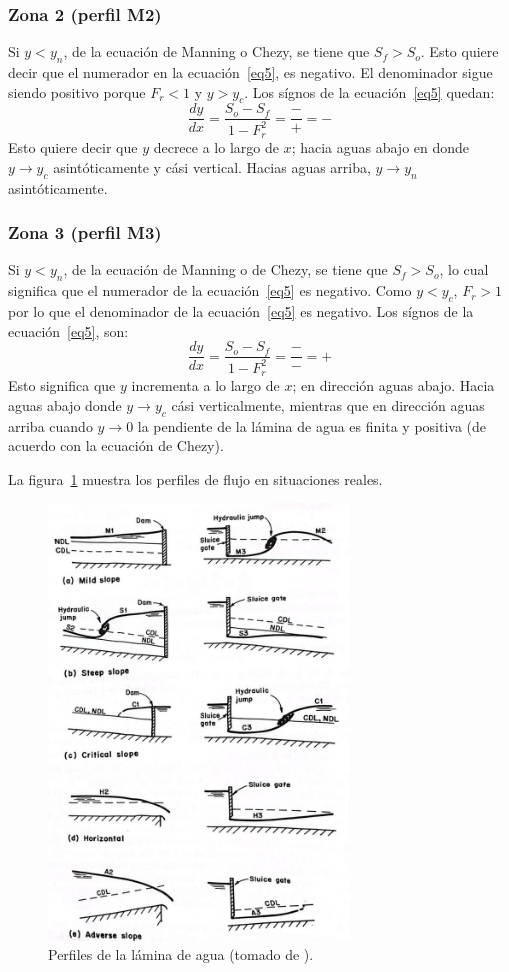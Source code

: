 \documentclass[11pt, oneside]{article}
\begin{document}
\subsubsection*{Zona 2 (perfil M2)}
Si $y < y_n$, de la ecuaci\'on de Manning o Chezy, se tiene que $S_f > S_o$. Esto quiere decir que el numerador en la ecuaci\'on~\ref{eq5}, es negativo. El denominador sigue siendo positivo porque $F_r < 1$ y $y > y_c$. Los s\'ignos de la ecuaci\'on~\ref{eq5} quedan:
$$
\frac{dy}{dx} = \frac{S_o - S_f}{1-F_r^2} = \frac{-}{+} = -
$$
Esto quiere decir que $y$ decrece a lo largo de $x$; hacia aguas abajo en donde $y \rightarrow y_c$ asint\'oticamente y c\'asi vertical. Hacias aguas arriba, $y \rightarrow y_n$ asint\'oticamente.

\subsubsection*{Zona 3 (perfil M3)}
Si $y < y_n$, de la ecuaci\'on de Manning o de Chezy, se tiene que $S_f > S_o$, lo cual significa que el numerador de la ecuaci\'on~\ref{eq5} es negativo. Como $y < y_c$, $F_r >1$ por lo que el denominador de la ecuaci\'on~\ref{eq5} es negativo. Los s\'ignos de la ecuaci\'on~\ref{eq5}, son:
$$
\frac{dy}{dx} = \frac{S_o - S_f}{1-F_r^2} = \frac{-}{-} = +
$$
Esto significa que $y$ incrementa a lo largo de $x$; en direcci\'on aguas abajo. Hacia aguas abajo donde $y \rightarrow y_c$ c\'asi verticalmente, mientras que en direcci\'on aguas arriba cuando $y \rightarrow 0$ la pendiente de la l\'amina de agua es finita y positiva (de acuerdo con la ecuaci\'on de Chezy). 

La figura~\ref{fig4} muestra los perfiles de flujo en situaciones reales.
\begin{figure}[h]
\centering
\includegraphics[width=8cm]{fig54.jpeg}
\caption{Perfiles de la l\'amina de agua (tomado de \cite{Chau}).}
\label{fig4}
\end{figure}
\end{document}

